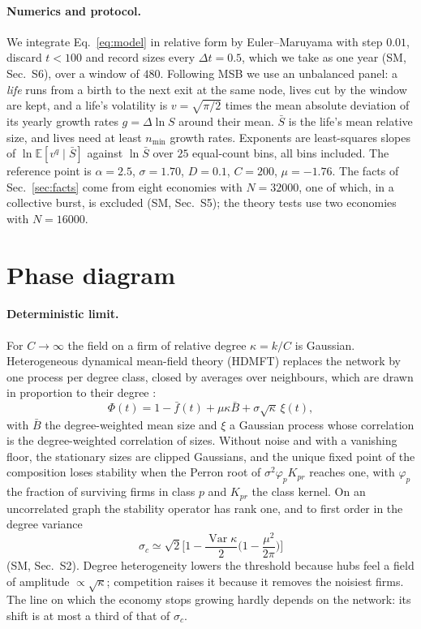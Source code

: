 \documentclass[pre,twocolumn,superscriptaddress,nofootinbib]{revtex4-2}
\newcommand{\E}{\mathbb E}
\newcommand{\Var}{\operatorname{Var}}
\newcommand{\Sb}{\bar S}
\begin{document}
\paragraph{Numerics and protocol.}  We integrate Eq.~\eqref{eq:model} in relative form by
Euler--Maruyama with step $0.01$, discard $t<100$ and record sizes every $\Delta t=0.5$, which we take as
one year (SM, Sec.~S6), over a window of $480$.  Following MSB we use an unbalanced panel: a \emph{life}
runs from a birth to the next exit at the same node, lives cut by the window are kept, and a life's
volatility is $v=\sqrt{\pi/2}$ times the mean absolute deviation of its yearly growth rates
$g=\Delta\ln S$ around their mean.  $\Sb$ is the life's mean relative size, and lives need at least
$n_{\min}$ growth rates.  Exponents are least-squares slopes of $\ln\E[v^q\mid\Sb]$ against $\ln\Sb$ over
$25$ equal-count bins, all bins included.  The reference point is $\alpha=2.5$, $\sigma=1.70$, $D=0.1$,
$C=200$, $\mu=-1.76$.  The facts of Sec.~\ref{sec:facts} come from eight economies with $N=32000$, one of
which, in a collective burst, is excluded (SM, Sec.~S5); the theory tests use two economies with
$N=16000$.

\section{Phase diagram}
\label{sec:phase}

\paragraph{Deterministic limit.}  For $C\to\infty$ the field on a firm of relative degree
$\kappa=k/C$ is Gaussian.  Heterogeneous dynamical mean-field theory (HDMFT) replaces the network by
one process per degree class, closed by averages over neighbours, which are drawn in proportion to
their degree \cite{aguirrelopez,patil2026}:
\begin{equation}
\Phi(t)=1-\bar f(t)+\mu\kappa\bar B+\sigma\sqrt\kappa\,\xi(t),
\label{eq:hdmft}
\end{equation}
with $\bar B$ the degree-weighted mean size and $\xi$ a Gaussian process whose correlation is the
degree-weighted correlation of sizes.  Without noise and with a vanishing floor, the stationary sizes
are clipped Gaussians, and the unique fixed point of the composition loses stability when the Perron
root of $\sigma^2\varphi_pK_{pr}$ reaches one, with $\varphi_p$ the fraction of surviving firms in class $p$
and $K_{pr}$ the class kernel.  On an uncorrelated graph the stability operator has rank one, and to
first order in the degree variance
\begin{equation}
\sigma_c\simeq\sqrt2\Big[1-\frac{\Var\kappa}{2}\Big(1-\frac{\mu^2}{2\pi}\Big)\Big]
\label{eq:sigmac}
\end{equation}
(SM, Sec.~S2).  Degree heterogeneity lowers the threshold because hubs feel a field of amplitude
$\propto\sqrt\kappa$; competition raises it because it removes the noisiest firms.  The line on which the
economy stops growing hardly depends on the network: its shift is at most a third of that of
$\sigma_c$.
\end{document}
